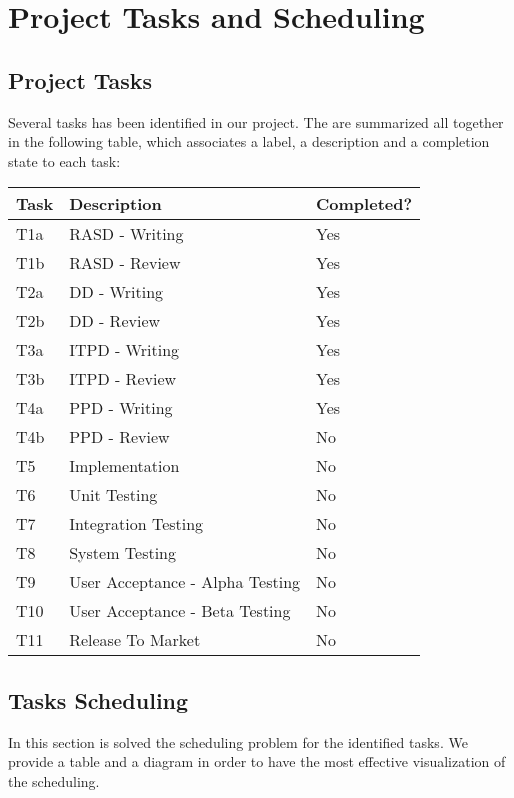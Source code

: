 \section{Project Tasks and Scheduling}
%
\subsection{Project Tasks}
Several tasks has been identified in our project.
The are summarized all together in the following table, which associates a label, a description and a completion state to each task:
\begin{center}
	\begin{tabulary}{\linewidth\tymin=70pt}{Y{2cm}|Y{6cm}|Y{2.25cm}}
		\textbf{Task} & \textbf{Description} & \textbf{Completed?}\\ \hline
		T1a & RASD - Writing & Yes \\ \hline
		T1b & RASD - Review & Yes \\ \hline
		T2a & DD - Writing & Yes \\ \hline
		T2b & DD - Review & Yes \\ \hline
		T3a & ITPD - Writing & Yes \\ \hline
		T3b & ITPD - Review & Yes \\ \hline
		T4a & PPD - Writing & Yes \\ \hline
		T4b & PPD - Review & No \\ \hline
		T5 & Implementation & No \\ \hline
		T6 & Unit Testing & No \\ \hline
		T7 & Integration Testing & No \\ \hline
		T8 & System Testing & No \\ \hline
		T9 & User Acceptance - Alpha Testing & No \\ \hline
		T10 & User Acceptance - Beta Testing & No \\ \hline
		T11 & Release To Market & No \\
	\end{tabulary}
\end{center}
%
\subsection{Tasks Scheduling}
In this section is solved the scheduling problem for the identified tasks.
We provide a table and a diagram in order to have the most effective visualization of the scheduling.
%
